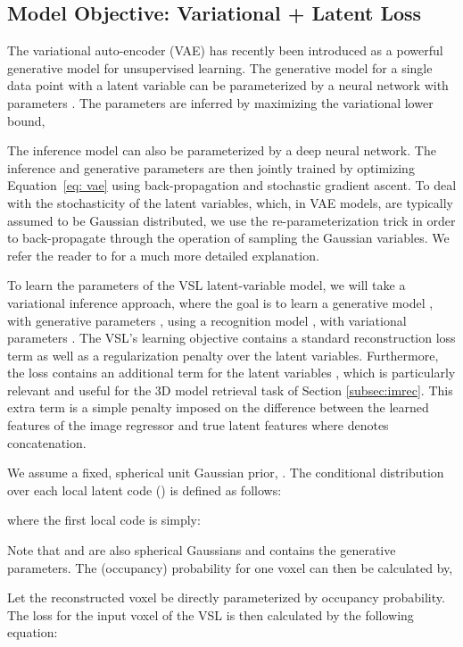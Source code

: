 \documentclass[10pt,twocolumn,letterpaper]{article}
\begin{document}
\subsection{Model Objective: Variational + Latent Loss}
The variational auto-encoder (VAE) \cite{kingma2013auto} has recently been introduced as a powerful generative model for unsupervised learning. The  generative model  for a single data point  with a latent variable  can be parameterized by a neural network with parameters . The parameters are inferred by maximizing the variational lower bound,

The inference model  can also be parameterized by a deep neural network. The inference and generative parameters are then jointly trained by optimizing Equation\ \ref{eq: vae} using back-propagation and stochastic gradient ascent. To deal with the stochasticity of the latent variables, which, in VAE models, are typically assumed to be Gaussian distributed, we use the re-parameterization trick in order to back-propagate through the operation of sampling the Gaussian variables. We refer the reader to \cite{doersch2016tutorial} for a much more detailed explanation.

To learn the parameters of the VSL latent-variable model, we will take a variational inference approach, where the goal is to learn a  generative model , with generative parameters , using a recognition model , with variational parameters . The VSL's learning objective contains a standard reconstruction loss term  as well as a regularization penalty  over the latent variables. Furthermore, the loss contains an additional term for the latent variables , which is particularly relevant and useful for the 3D model retrieval task of Section \ref{subsec:imrec}. This extra term is a simple  penalty imposed on the difference between the learned features of the image regressor  and true latent features  where  denotes concatenation.

We assume a fixed, spherical unit Gaussian prior, . The conditional distribution over each local latent code () is defined as follows:

where the first local code  is simply:

Note that  and  are also spherical Gaussians and  contains the generative parameters.
The (occupancy) probability for one voxel  can then be calculated by,


Let the reconstructed voxel  be directly parameterized by occupancy probability. The loss  for the input voxel  of the VSL is then calculated by the following equation:
\end{document}
